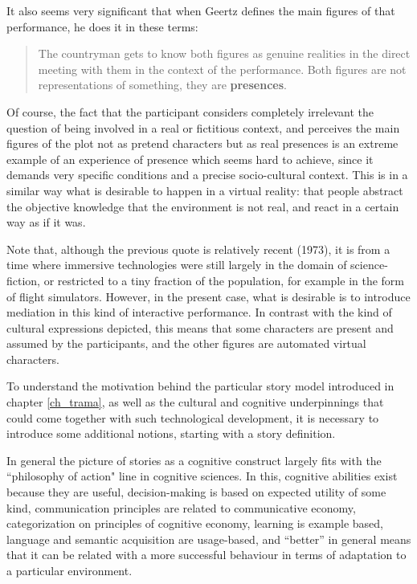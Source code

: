 \documentclass[
		twoside,openright,titlepage,numbers=noenddot,manychapters,
		headinclude,%
                footinclude=false,cleardoublepage=empty,
                BCOR=5mm,
		fontsize=11pt, %
                 enabledeprecatedfontcommands]{scrreprt}
\begin{document}
It also seems very significant that when Geertz defines the main figures of that performance, he does it in these terms:

\begin{quote}

The countryman gets to know both figures as genuine realities in the direct meeting with them in the context of the performance. Both figures are not representations of something, they are \textbf{presences}.

\end{quote}


Of course, the fact that the participant considers completely irrelevant the question of being involved in a real or fictitious context, and perceives the main figures of the plot not as pretend characters  but as real presences is an extreme example of an experience of presence which seems hard to achieve, since it demands very specific conditions and a precise socio-cultural context. This is in a similar way what is desirable to happen in a virtual reality: that people abstract the objective knowledge that the environment is not real, and react in a certain way as if it was. 

Note that, although the previous quote is relatively recent (1973), it is from a time where immersive technologies were still largely in the domain of science-fiction, or restricted to a tiny fraction of the population, for example in the form of flight simulators. However, in the present case, what is desirable is to introduce mediation in this kind of interactive performance. In contrast with the kind of cultural expressions depicted, this means that some characters are present and assumed by the participants, and the other figures are automated virtual characters.


To understand the motivation behind the particular story model introduced in chapter \ref{ch_trama}, as well as the cultural and cognitive underpinnings that could come together with such technological development, it is necessary to introduce some additional notions, starting with a story definition. 

 In general the picture of stories as a cognitive construct largely fits with the ``philosophy of action" line in cognitive sciences. In this, cognitive abilities exist because they are useful, decision-making is based on expected utility of some kind, communication principles are related to communicative economy, categorization on principles of cognitive economy, learning is example based, language and semantic acquisition are usage-based, and ``better'' in general means that it can be related with a more successful behaviour in terms of adaptation to a particular environment. 
\end{document}
